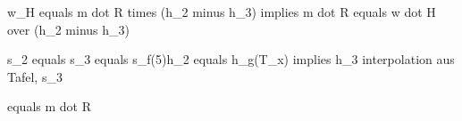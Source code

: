 w_H equals m dot R times (h_2 minus h_3) implies m dot R equals w dot H over (h_2 minus h_3)

s_2 equals s_3 equals s_f(5)h_2 equals h_g(T_x) implies h_3 interpolation aus Tafel, s_3

equals m dot R